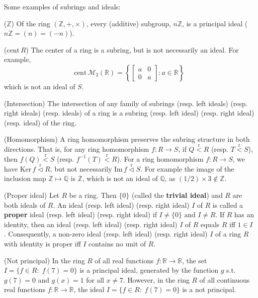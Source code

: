 \documentclass{article}
\newcommand{\nles}{\vartriangleleft}
\newcommand{\Ker}{\text{Ker}\,}
\newcommand{\Ima}{\text{Im}\,}
\newcommand{\subr}{\overset{\text{r}}{<}} %
\newcommand{\ideal}{\overset{\text{r}}{\nles}} %
\newcommand{\cent}{\text{cent}\,} %
\begin{document}
\begin{Rmk}{}
    Some examples of subrings and ideals:
    \begin{compactenum}
        \item ($\mathbb{Z}$) \textcolor{Th}{Of the ring $(\mathbb{Z},+,\times)$, every (additive) subgroup, $n\mathbb{Z}$, is a principal ideal ($n\mathbb{Z} = (n) = (-n)$).}
        \item ($\cent R$) \textcolor{Th}{The center of a ring is a subring, but is not necessarily an ideal.} For example, \textcolor{Th}{
        $$ \cent\mathcal{M}_2(\mathbb{R}) = \left\{ \begin{bmatrix}
            a & 0 \\
            0 & a
        \end{bmatrix} : a\in \mathbb{R} \right\} $$
        which is not an ideal of $S$.}
        \item (Intersection) \textcolor{Th}{The intersection of any family of subrings (resp. left ideals) (resp. right ideals) (resp. ideals) of a ring is a subring (resp. left ideal) (resp. right ideal) (resp. ideal) of the ring.} 
        \item (Homomorphism) \textcolor{Th}{A ring homomorphism preserves the subring structure in both directions.} That is, for any ring homomorphism $f: R\to S$, if $Q\subr R$ (resp. $T\subr S$), then $f(Q)\subr S$ (resp. $f^{-1}(T)\subr R$). \textcolor{Th}{For a ring homomorphism $f: R\to S$, we have $\Ker f\ideal R$, but not necessarily $\Ima f\ideal S$.} For example the image of the inclusion map $\mathbb{Z}\mapsto \mathbb{Q}$ is $\mathbb{Z}$, which is not an ideal of $\mathbb{Q}$, as $(1/2)\times 3\notin \mathbb{Z}$.
        \item (Proper ideal) \textcolor{Th}{Let $R$ be a ring. Then $\{0\}$ (called the \textbf{trivial ideal}) and $R$ are both ideals of $R$.} \textcolor{Df}{An ideal (resp. left ideal) (resp. right ideal) $I$ of $R$ is called a \textbf{proper} ideal (resp. left ideal) (resp. right ideal) if $I\neq \{0\}$ and $I\neq R$.} \textcolor{Th}{If $R$ has an identity, then an ideal (resp. left ideal) (resp. right ideal) $I$ of $R$ equals $R$ iff $1\in I$.} Consequently, \textcolor{Th}{a non-zero ideal (resp. left ideal) (resp. right ideal) $I$ of a ring $R$ with identity is proper iff $I$ contains no unit of $R$.}
        \item (Not principal) \textcolor{Th}{In the ring $R$ of all real functions $f: \mathbb{R}\to\mathbb{R}$, the set $I = \{f\in R:\; f(7) = 0\}$ is a principal ideal, generated by the function $g$ s.t. $g(7) = 0$ and $g(x) = 1$ for all $x\neq 7$.} However, \textcolor{Th}{in the ring $R$ of all continuous real functions $f: \mathbb{R}\to\mathbb{R}$, the ideal $I = \{f\in R:\; f(7) = 0\}$ is a not principal.} 
    \end{compactenum}
\end{Rmk}
\end{document}
